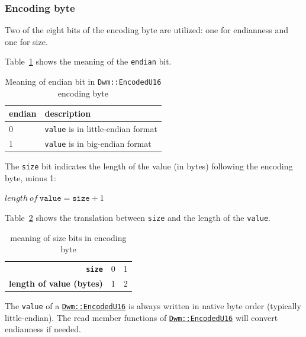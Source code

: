 
\subsubsection{Encoding byte}
Two of the eight bits of the encoding byte are utilized: one for
endianness and one for size.

Table~\ref{table:EncodedU16EndianBit} shows the meaning of the \texttt{endian}
bit.
\begin{table}[H]
\begin{center}
\begin{tabular}{ll}
  \textbf{endian} & \textbf{description} \\ \hline
  0 & \texttt{value} is in little-endian format \\ \hline
  1 & \texttt{value} is in big-endian format \\
\end{tabular}
\caption{Meaning of endian bit in \texttt{Dwm::EncodedU16} encoding byte}
\label{table:EncodedU16EndianBit}
\end{center}
\end{table}

The \texttt{size} bit indicates the length of the value (in bytes)
following the encoding byte, minus 1:

  $length\ of\ \texttt{value} = \texttt{size} + 1$

Table~\ref{table:Encodedu16SizeBit} shows the translation between
\texttt{size} and the length of the \texttt{value}.

\begin{table}[H]
\begin{center}
\begin{tabular}{r|l|l}
  \textbf{\texttt{size}} & 0 & 1 \\
  \textbf{length of value (bytes)} & 1 & 2 \\
\end{tabular}
\end{center}
\caption{meaning of size bits in encoding byte}
\label{table:Encodedu16SizeBit}
\end{table}

The \texttt{value} of a
\hyperref[class:EncodedU16]{\texttt{Dwm::EncodedU16}} is always
written in native byte order (typically little-endian). The read
member functions of
\hyperref[class:EncodedU16]{\texttt{Dwm::EncodedU16}} will convert
endianness if needed.

